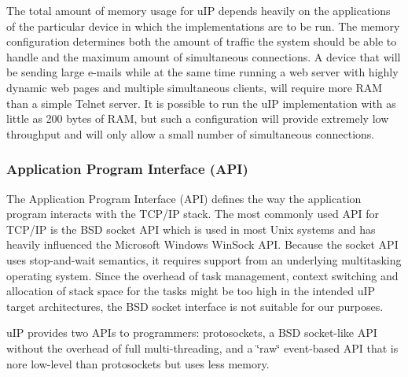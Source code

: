 \-The total amount of memory usage for u\-I\-P depends heavily on the applications of the particular device in which the implementations are to be run. \-The memory configuration determines both the amount of traffic the system should be able to handle and the maximum amount of simultaneous connections. \-A device that will be sending large e-\/mails while at the same time running a web server with highly dynamic web pages and multiple simultaneous clients, will require more \-R\-A\-M than a simple \-Telnet server. \-It is possible to run the u\-I\-P implementation with as little as 200 bytes of \-R\-A\-M, but such a configuration will provide extremely low throughput and will only allow a small number of simultaneous connections.\hypertarget{a00060_api}{}\subsubsection{\-Application Program Interface (\-A\-P\-I)}\label{a00060_api}
\-The \-Application \-Program \-Interface (\-A\-P\-I) defines the way the application program interacts with the \-T\-C\-P/\-I\-P stack. \-The most commonly used \-A\-P\-I for \-T\-C\-P/\-I\-P is the \-B\-S\-D socket \-A\-P\-I which is used in most \-Unix systems and has heavily influenced the \-Microsoft \-Windows \-Win\-Sock \-A\-P\-I. \-Because the socket \-A\-P\-I uses stop-\/and-\/wait semantics, it requires support from an underlying multitasking operating system. \-Since the overhead of task management, context switching and allocation of stack space for the tasks might be too high in the intended u\-I\-P target architectures, the \-B\-S\-D socket interface is not suitable for our purposes.

u\-I\-P provides two \-A\-P\-Is to programmers\-: protosockets, a \-B\-S\-D socket-\/like \-A\-P\-I without the overhead of full multi-\/threading, and a \char`\"{}raw\char`\"{} event-\/based \-A\-P\-I that is nore low-\/level than protosockets but uses less memory.

